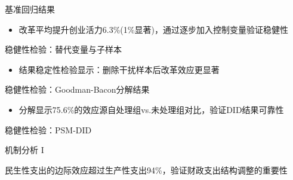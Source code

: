 \documentclass{beamer}
\newcommand{\tightlist}{%
  \setlength{\itemsep}{0pt}\setlength{\parskip}{0pt}}
\begin{document}
\begin{frame}{基准回归结果}
\label{ux57faux51c6ux56deux5f52ux7ed3ux679c}
\begin{adjustbox}{max width=0.95\textwidth}

\end{adjustbox}

\begin{itemize}
\tightlist
\item
  改革平均提升创业活力6.3\%(1\%显著)，通过逐步加入控制变量验证稳健性
\end{itemize}
\end{frame}

\begin{frame}{稳健性检验：替代变量与子样本}
\label{ux7a33ux5065ux6027ux68c0ux9a8cux66ffux4ee3ux53d8ux91cfux4e0eux5b50ux6837ux672c}
\vspace{-2mm}
\begin{adjustbox}{width=0.95\textwidth,center} 

\end{adjustbox}

\begin{itemize}
\tightlist
\item
  结果稳定性检验显示：删除干扰样本后改革效应更显著
\end{itemize}
\end{frame}

\begin{frame}{稳健性检验：Goodman-Bacon分解结果}
\label{ux7a33ux5065ux6027ux68c0ux9a8cgoodman-baconux5206ux89e3ux7ed3ux679c}
\begin{adjustbox}{max totalheight=0.7\textheight} 

\end{adjustbox}

\vspace{-2mm}

\begin{itemize}
\tightlist
\item
  分解显示75.6\%的效应源自处理组vs.未处理组对比，验证DID结果可靠性
\end{itemize}
\end{frame}

\begin{frame}{稳健性检验：PSM-DID}
\label{ux7a33ux5065ux6027ux68c0ux9a8cpsm-did}
\begin{adjustbox}{max totalheight=0.7\textheight} 

\end{adjustbox}

\vspace{-2mm}
\end{frame}

\begin{frame}{机制分析 I}
\label{ux673aux5236ux5206ux6790-i}
\begin{adjustbox}{max width=0.95\textwidth,center}

\end{adjustbox}

\scriptsize

民生性支出的边际效应超过生产性支出94\%，验证财政支出结构调整的重要性
\end{frame}
\end{document}
